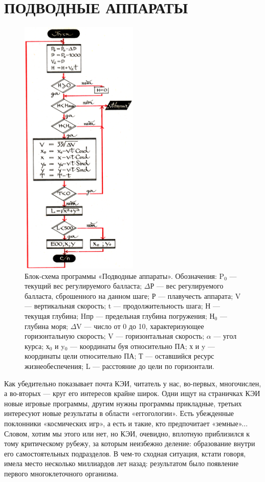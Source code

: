 \documentclass[11pt,a4paper,oneside]{article}
\begin{document}
\section{ПОДВОДНЫЕ АППАРАТЫ}
\begin{figure}[H]
\includegraphics[width=0.5\textwidth]{submarine}
\caption{Блок-схема программы «Подводные аппараты». Обозначения: P$_{0}$ — текущий вес регулируемого балласта; $\Delta$Р — вес регулируемого балласта, сброшенного на данном шаге; Р — плавучесть аппарата; V — вертикальная скорость; t — продолжительность шага; Н — текущая глубина; Hпр — предельная глубина погружения; Н$_{0}$ — глубина моря; $\Delta$V — число от 0 до 10, характеризующее горизонтальную скорость; V — горизонтальная скорость; $\alpha$ — угол курса; х$_{0}$ и y$_{0}$ — координаты буя относительно ПА; х и y — координаты цели относительно ПА; Т — оставшийся ресурс жизнеобеспечения; L — расстояние до цели по горизонтали.}
\end{figure}

Как убедительно показывает почта КЭИ, читатель у нас, во-первых, многочислен, а во-вторых — круг его интересов крайне широк. Одни ищут на страничках КЭИ новые игровые программы, другим нужны программы прикладные, третьих интересуют новые результаты в области «еггогологии». Есть убежденные поклонники «космических игр», а есть и такие, кто предпочитает «земные»... Словом, хотим мы этого или нет, но КЭИ, очевидно, вплотную приблизился к тому критическому рубежу, за которым неизбежно деление: образование внутри его самостоятельных подразделов. В чем-то сходная ситуация, кстати говоря, имела место несколько миллиардов лет назад: результатом было появление первого многоклеточного организма.
\end{document}
